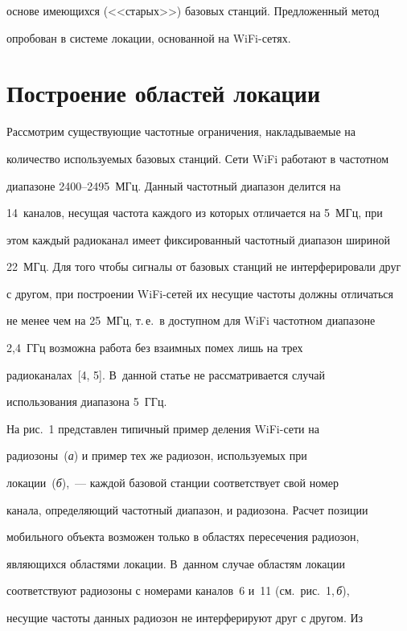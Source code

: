 основе имеющихся (<<старых>>) базовых станций. Предложенный метод

опробован в системе локации, основанной на WiFi-сетях.



\section{Построение областей локации }



 Рассмотрим существующие частотные ограничения, накладываемые на

количество используемых базовых станций. Сети WiFi работают в частотном

диапазоне 2400--2495~МГц. Данный частотный диапазон делится на

14~каналов, несущая частота каждого из которых отличается на 5~МГц, при

этом каждый радиоканал имеет фиксированный частотный диапазон шириной

22~МГц. Для того чтобы сигналы от базовых станций не интерферировали друг

с другом, при построении WiFi-се\-тей их несущие частоты должны отличаться

не менее чем на 25~МГц, т.\,е.\ в доступном для WiFi частотном диапазоне

2,4~ГГц возможна работа без взаимных помех лишь на трех

 радиоканалах~[4, 5]. В~данной статье не рассматривается случай

использования диапазона 5~ГГц.



 На рис.~1 представлен типичный пример деления WiFi-сети на

радиозоны~(\textit{а}) и пример тех же радиозон, используемых при

локации~(\textit{б}),~--- каждой базовой станции соответствует свой номер

канала, определяющий частотный диапазон, и радиозона. Расчет позиции

мобильного объекта возможен только в областях пересечения радиозон,

являющихся областями локации. В~данном случае областям локации

соответствуют радиозоны с номерами каналов~6 и~11 (см.\ рис.~1,\,\textit{б}),

несущие частоты данных радиозон не интерферируют друг с другом. Из

